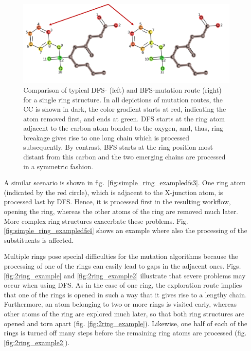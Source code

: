 \begin{figure}
\includegraphics[scale=1.4]{simple_ring_exampledfs.png}
\caption{Comparison of typical DFS- (left) and BFS-mutation route (right) for a single ring structure. In all depictions of mutation routes, the CC is shown in dark, the color gradient starts at red, indicating the atom removed first, and ends at green. DFS
starts at the ring atom adjacent to the carbon atom bonded to the oxygen, and, thus, ring breakage gives rise to one long
chain which is processed subsequently. By contrast, BFS starts at the ring position most distant from this carbon and the two emerging chains are processed in a symmetric fashion.
}
\label{fig:comparison_dfs_bfs}
\end{figure}



A similar scenario is shown in fig.~\ref{fig:simple_ring_exampledfs3}. One ring atom (indicated by the red circle), which is adjacent to the X-junction atom, is processed last by  DFS. Hence, it is processed first in the resulting \trafo workflow, opening the ring, whereas the other atoms of the ring are removed much later.
More complex ring structures exacerbate these problems. Fig. \ref{fig:simple_ring_exampledfs4} shows an example where also the processing of the substituents is affected.

Multiple rings pose special difficulties for the mutation algorithms because
the processing of one of the rings can easily lead to gaps in the adjacent
ones. Figs. \ref{fig:2ring_example} and  \ref{fig:2ring_example2} illustrate that severe problems may occur when using DFS.
As in the case of one ring, the exploration route implies that one
of the rings is opened in such a way that it gives rise to a lengthy chain.
Furthermore, an atom belonging to two or more rings is visited early, whereas other atoms of the ring are explored much later, so that both ring structures are opened
and torn apart (fig. \ref{fig:2ring_example}). Likewise, one half of each of the
rings is turned off many steps before the remaining ring atoms are processed (fig. \ref{fig:2ring_example2}). 

